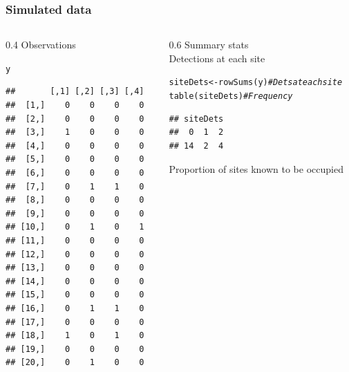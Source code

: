 \documentclass[color=usenames,dvipsnames]{beamer}\usepackage[]{graphicx}\usepackage[]{xcolor}
\makeatletter
\newcommand{\hlcom}[1]{\textcolor[rgb]{0.514,0.506,0.514}{\textit{#1}}}%
\newcommand{\hldef}[1]{\textcolor[rgb]{0,0,0}{#1}}%
\newcommand{\hlkwb}[1]{\textcolor[rgb]{0,0.341,0.682}{#1}}%
\newcommand{\hlkwd}[1]{\textcolor[rgb]{0.004,0.004,0.506}{#1}}%
\newenvironment{kframe}{%
 \def\at@end@of@kframe{}%
 \ifinner\ifhmode%
  \def\at@end@of@kframe{\end{minipage}}%
  \begin{minipage}{\columnwidth}%
 \fi\fi%
 \def\FrameCommand##1{\hskip\@totalleftmargin \hskip-\fboxsep
 \colorbox{shadecolor}{##1}\hskip-\fboxsep
     \hskip-\linewidth \hskip-\@totalleftmargin \hskip\columnwidth}%
 \MakeFramed {\advance\hsize-\width
   \@totalleftmargin\z@ \linewidth\hsize
   \@setminipage}}%
 {\par\unskip\endMakeFramed%
 \at@end@of@kframe}
\newenvironment{knitrout}{}{} %
\makeatother
\begin{document}
\begin{frame}[fragile]
  \frametitle{Simulated data}
  \begin{columns}
    \begin{column}{0.4\textwidth}
      \small
      Observations
\begin{knitrout}\scriptsize
{}\color{fgcolor}\begin{kframe}
\begin{alltt}
\hldef{y}
\end{alltt}
\begin{verbatim}
##       [,1] [,2] [,3] [,4]
##  [1,]    0    0    0    0
##  [2,]    0    0    0    0
##  [3,]    1    0    0    0
##  [4,]    0    0    0    0
##  [5,]    0    0    0    0
##  [6,]    0    0    0    0
##  [7,]    0    1    1    0
##  [8,]    0    0    0    0
##  [9,]    0    0    0    0
## [10,]    0    1    0    1
## [11,]    0    0    0    0
## [12,]    0    0    0    0
## [13,]    0    0    0    0
## [14,]    0    0    0    0
## [15,]    0    0    0    0
## [16,]    0    1    1    0
## [17,]    0    0    0    0
## [18,]    1    0    1    0
## [19,]    0    0    0    0
## [20,]    0    1    0    0
\end{verbatim}
\end{kframe}
\end{knitrout}
  \end{column}
  \begin{column}{0.6\textwidth}
    \pause
    {\centering Summary stats \\}
    \vspace{24pt}
  Detections at each site \\
\begin{knitrout}\scriptsize
{}\color{fgcolor}\begin{kframe}
\begin{alltt}
\hldef{siteDets} \hlkwb{<-} \hlkwd{rowSums}\hldef{(y)} \hlcom{# Dets at each site}
\hlkwd{table}\hldef{(siteDets)}        \hlcom{# Frequency}
\end{alltt}
\begin{verbatim}
## siteDets
##  0  1  2 
## 14  2  4
\end{verbatim}
\end{kframe}
\end{knitrout}
\pause
\vfill
\small
Proportion of sites known to be occupied \\
\begin{knitrout}\scriptsize

\end{knitrout}
\end{column}
\end{columns}
\end{frame}
\end{document}

